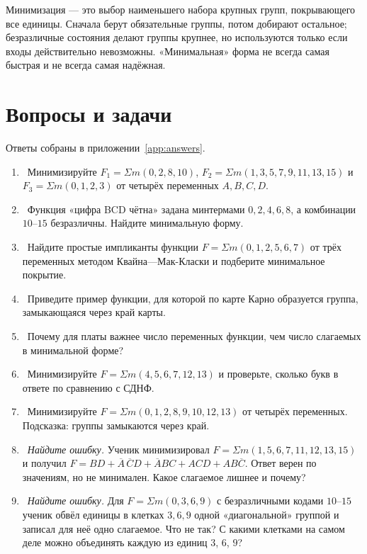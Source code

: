 \begin{ideabox}
Минимизация --- это выбор наименьшего набора крупных групп, покрывающего все
единицы. Сначала берут обязательные группы, потом добирают остальное;
безразличные состояния делают группы крупнее, но используются только если
входы действительно невозможны. «Минимальная» форма не всегда самая
быстрая и не всегда самая надёжная.
\end{ideabox}

\section{Вопросы и задачи}
\label{sec:tasks-minimize}

Ответы собраны в приложении~\ref{app:answers}.

\begin{taskbox}
\begin{enumerate}
  \item {}~Минимизируйте $F_1=\Sigma m(0,2,8,10)$, $F_2=\Sigma m(1,3,5,7,9,11,13,15)$ и $F_3=\Sigma m(0,1,2,3)$ от четырёх переменных $A,B,C,D$.
  \item {}~Функция «цифра BCD чётна» задана минтермами $0,2,4,6,8$, а комбинации $10$--$15$ безразличны. Найдите минимальную форму.
  \item {}~Найдите простые импликанты функции $F=\Sigma m(0,1,2,5,6,7)$ от трёх переменных методом Квайна---Мак-Класки и подберите минимальное покрытие.
  \item {}~Приведите пример функции, для которой по карте Карно образуется группа, замыкающаяся через край карты.
  \item {}~Почему для платы важнее число переменных функции, чем число слагаемых в минимальной форме?
  \item {}~Минимизируйте $F=\Sigma m(4,5,6,7,12,13)$ и проверьте, сколько букв в ответе по сравнению с СДНФ.
  \item {}~Минимизируйте $F=\Sigma m(0,1,2,8,9,10,12,13)$ от четырёх переменных. Подсказка: группы замыкаются через край.
  \item {}~\emph{Найдите ошибку.} Ученик минимизировал $F=\Sigma m(1,5,6,7,11,12,13,15)$ и получил $F=BD+\overline{A}\,\overline{C}D+\overline{A}BC+ACD+AB\overline{C}$. Ответ верен по значениям, но не минимален. Какое слагаемое лишнее и почему?
  \item {}~\emph{Найдите ошибку.} Для $F=\Sigma m(0,3,6,9)$ с безразличными кодами $10$--$15$ ученик обвёл единицы в клетках $3,6,9$ одной «диагональной» группой и записал для неё одно слагаемое. Что не так? С какими клетками на самом деле можно объединять каждую из единиц $3$, $6$, $9$?

\end{enumerate}
\end{taskbox}
